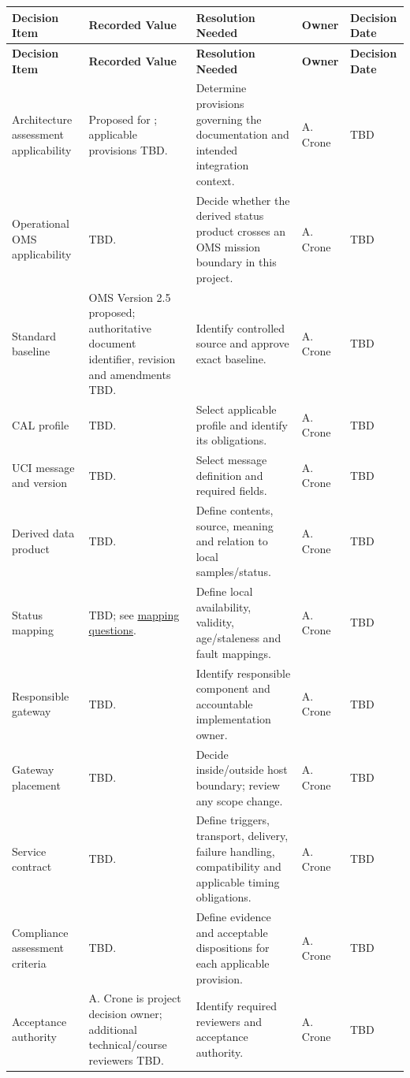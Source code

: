 \begin{tabularx}{\linewidth}{L{3cm}YYL{1.7cm}L{1.8cm}}
\caption{OMS Unresolved Decision Register\label{Table:OMSUnresolvedDecisions}}\\
\toprule\textbf{Decision Item} & \textbf{Recorded Value} & \textbf{Resolution Needed} & \textbf{Owner} & \textbf{Decision Date}\\\midrule\endfirsthead
\toprule\textbf{Decision Item} & \textbf{Recorded Value} & \textbf{Resolution Needed} & \textbf{Owner} & \textbf{Decision Date}\\\midrule\endhead\bottomrule\endlastfoot
Architecture assessment applicability & Proposed for ; applicable provisions TBD. & Determine provisions governing the documentation and intended integration context. & A. Crone & TBD\\
Operational OMS applicability & TBD. & Decide whether the derived status product crosses an OMS mission boundary in this project. & A. Crone & TBD\\
Standard baseline & OMS Version 2.5 proposed; authoritative document identifier, revision and amendments TBD. & Identify controlled source and approve exact baseline. & A. Crone & TBD\\
CAL profile & TBD. & Select applicable profile and identify its obligations. & A. Crone & TBD\\
UCI message and version & TBD. & Select message definition and required fields. & A. Crone & TBD\\
Derived data product & TBD. & Define contents, source, meaning and relation to local samples/status. & A. Crone & TBD\\
Status mapping & TBD; see \hyperref[Table:OMSStatusMapping]{mapping questions}. & Define local availability, validity, age/staleness and fault mappings. & A. Crone & TBD\\
Responsible gateway & TBD. & Identify responsible component and accountable implementation owner. & A. Crone & TBD\\
Gateway placement & TBD. & Decide inside/outside host boundary; review any scope change. & A. Crone & TBD\\
Service contract & TBD. & Define triggers, transport, delivery, failure handling, compatibility and applicable timing obligations. & A. Crone & TBD\\
Compliance assessment criteria & TBD. & Define evidence and acceptable dispositions for each applicable provision. & A. Crone & TBD\\
Acceptance authority & A. Crone is project decision owner; additional technical/course reviewers TBD. & Identify required reviewers and acceptance authority. & A. Crone & TBD\\
\end{tabularx}
